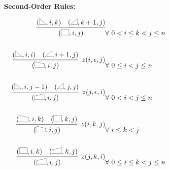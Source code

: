 \documentclass[11pt]{article}
\newcommand{\NULL}{\ensuremath{\epsilon}}
\newcommand{\abox}{\scalebox{0.2}{\tikz{
    \coordinate (A) at (0,0);
    \coordinate (B) at (0,1.5cm);
    \coordinate (C) at (-2cm, 1.5cm);
    \coordinate (D) at (-2cm, 0cm);
    \draw[line width = 0.05cm] (A)--(B)--(C)--(D)--cycle;
    }}}
\newcommand{\rtrap}{\scalebox{0.2}{\tikz{
    \coordinate (A) at (0,0);
    \coordinate (B) at (90:1.5cm);
    \coordinate (C) at (2.5,0.9cm);
    \coordinate (D) at (0:2.5cm);
    \draw[line width = 0.05cm] (A)--(B)--(C)--(D)--cycle;
    }}}
\newcommand{\ltrap}{\scalebox{0.2}{\tikz{
    \coordinate (A) at (0,0);
    \coordinate (B) at (90:1.5cm);
    \coordinate (C) at (-2.5,0.9cm);
    \coordinate (D) at (180:2.5cm);
    \draw[line width = 0.05cm] (A)--(B)--(C)--(D)--cycle;
    }}}
\newcommand{\rtriskip}{\scalebox{0.2}{\tikz{
      \begin{scope}[decoration={
          markings,
          mark=at position 0.3 with {\arrow[scale=1.75]{<}},
          mark=at position 0.55 with {\arrow[scale=1.75]{<}},
          mark=at position 0.8 with {\arrow[scale=1.75]{<}}
        }]
    \coordinate (A) at (0,0);
    \coordinate (B) at (90:1.5cm);
    \coordinate (C) at (180:-1.7cm);
        \draw[postaction={decorate}, line width = 0.05cm] (B) -- (C);
        \draw[line width = 0.05cm] (A)--(B)--(C)--cycle;
      \end{scope}
    }}}
\newcommand{\rtri}{\scalebox{0.2}{\tikz{
    \coordinate (A) at (0,0);
    \coordinate (B) at (90:1.5cm);
    \coordinate (C) at (180:-1.7cm);
    \draw[line width = 0.05cm] (A)--(B)--(C)--cycle;
    }}}
\newcommand{\ltri}{\scalebox{0.2}{\tikz{
    \coordinate (A) at (0,0);
    \coordinate (B) at (90:1.5cm);
    \coordinate (C) at (180:1.7cm);
    \draw[line width = 0.05cm] (A)--(B)--(C)--cycle;
    }}}
\begin{document}
\begin{figure*}
\begin{subfigure}{0.5\textwidth}
\end{subfigure}%
\begin{subfigure}{0.5\textwidth}




  \noindent \textbf{Second-Order Rules:}

\begin{eqnarray*}
  \infer{(\abox, i,j)}{(\rtri, i,k)  &  (\ltri, k+1, j) } &  \forall\ 0 < i\leq k < j \leq n \\\\
  \infer[z(i, \NULL, j)]{(\rtrap, i,j)}{(\rtri, i,i)  &  (\ltri, i+1, j) } &  \forall\ 0 \leq i < j \leq n\\\\
  \infer[z(j, \NULL, i)]{(\ltrap, i,j)}{(\rtri, i,j-1)  &  (\ltri, j, j) } & \forall\ 0 <  i < j \leq n\\\\
  \infer[z(i, k, j)]{(\rtrap, i,j)}{(\rtrap, i,k)  &  (\abox, k, j) } &  \forall\ i\leq k < j \\\\
  \infer[z(j,  k, i)]{(\ltrap, i,j)}{(\abox, i,k)  &  (\ltrap, k, j) } &  \forall\ 0 \leq i\leq k < j \leq n\\\\
\end{eqnarray*}

\end{subfigure}



\end{figure*}
\end{document}
